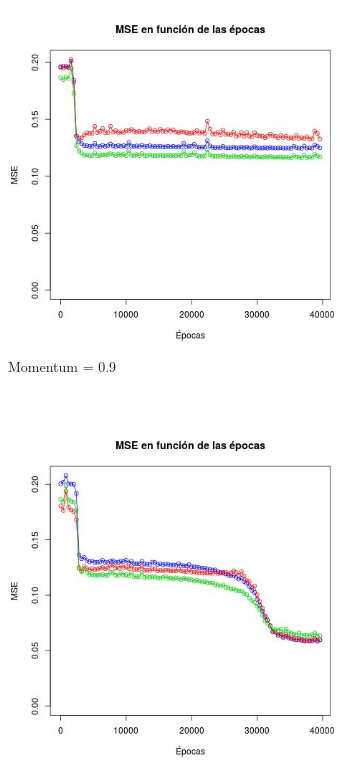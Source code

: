 \documentclass[12pt, a4paper]{article}
\begin{document}
\begin{figure}
    \centering

    \begin{subfigure}[b]{0.45\textwidth}
        \includegraphics[width=\textwidth]{mse33}
        \caption{Momentum = 0.9}
    \end{subfigure}
      ~ %
    \begin{subfigure}[b]{0.45\textwidth}
        \includegraphics[width=\textwidth]{mse33e}

\end{subfigure}
\end{figure}
\end{document}

